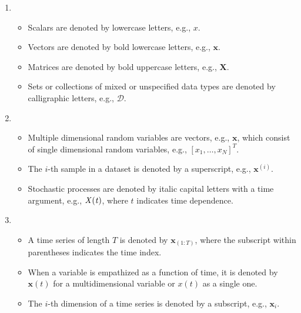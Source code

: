 \begin{enumerate}[label=\textbf{\arabic*.}, wide=0pt, leftmargin=*, labelsep=1em]
    \item[Basic symbols]\mbox{}\\[-1em] 
    \begin{itemize}
        \setlength\itemsep{1em}     %
        \setlength\parsep{0em}      %
        \item Scalars are denoted by lowercase letters, e.g., $x$.
        \item Vectors are denoted by bold lowercase letters, e.g., $\boldsymbol{x}$.
        \item Matrices are denoted by bold uppercase letters, e.g., $\boldsymbol{X}$.
        \item Sets or collections of mixed or unspecified data types are denoted by calligraphic letters, e.g., $\mathcal{D}$.
    \end{itemize}

    \item[Random variables]\mbox{}\\[-1em] 
    \begin{itemize}[itemsep=1em]
        \setlength\itemsep{1em}     %
        \setlength\parsep{0em}      %
        \item Multiple dimensional random variables are vectors, e.g., $\boldsymbol{x}$, which consist of single dimensional random variables, e.g., $[x_1,\dots,x_N]^T$.
        \item The $i$-th sample in a dataset is denoted by a superscript, e.g., $\boldsymbol{x}^{(i)}$.
        \item Stochastic processes are denoted by italic capital letters with a time argument, e.g., $\it{X}(t)$, where $t$ indicates time dependence.
    \end{itemize}

    \item[Time series]\mbox{}\\[-1em] 
    \begin{itemize}[itemsep=1em]
        \setlength\itemsep{1em}     %
        \setlength\parsep{0em}      %
        \item A time series of length $T$ is denoted by $\boldsymbol{x}_{(1:T)}$, where the subscript within parentheses indicates the time index.
        \item When a variable is empathized as a function of time, it is denoted by $\boldsymbol{x}(t)$ for a multidimensional variable or $x(t)$ as a single one.
        \item The $i$-th dimension of a time series is denoted by a subscript, e.g., $\boldsymbol{x}_i$.
    \end{itemize}


\end{enumerate}

